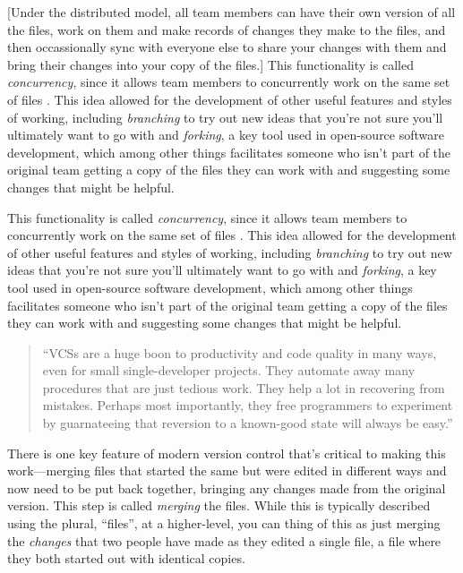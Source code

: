 \documentclass[]{tufte-book}
\begin{document}
{[}Under the distributed model, all team members can have their own version of all
the files, work on them and make records of changes they make to the files, and
then occassionally sync with everyone else to share your changes with them and
bring their changes into your copy of the files.{]} This functionality is called
\emph{concurrency}, since it allows team members to concurrently work on the same set
of files \citep{raymondunderstanding}. This idea allowed for the development of other
useful features and styles of working, including \emph{branching} to try out new
ideas that you're not sure you'll ultimately want to go with and \emph{forking}, a
key tool used in open-source software development, which among other things
facilitates someone who isn't part of the original team getting a copy of the
files they can work with and suggesting some changes that might be helpful.

This functionality is called \emph{concurrency}, since it allows team members to
concurrently work on the same set of files \citep{raymondunderstanding}. This idea
allowed for the development of other useful features and styles of working,
including \emph{branching} to try out new ideas that you're not sure you'll
ultimately want to go with and \emph{forking}, a key tool used in open-source
software development, which among other things facilitates someone who isn't
part of the original team getting a copy of the files they can work with and
suggesting some changes that might be helpful.

\begin{quote}
``VCSs are a huge boon to productivity and code quality in many ways, even for small
single-developer projects. They automate away many procedures that are just tedious
work. They help a lot in recovering from mistakes. Perhaps most importantly, they
free programmers to experiment by guarnateeing that reversion to a known-good
state will always be easy.'' \citep{raymond2003art}
\end{quote}

There is one key feature of modern version control that's
critical to making this work---merging files that started the same but were edited in
different ways and now need to be put back together, bringing any changes made from the
original version. This step is called \emph{merging} the files. While this is typically
described using the plural, ``files'', at a higher-level, you can thing of this as
just merging the \emph{changes} that two people have made as they edited a single file, a
file where they both started out with identical copies.
\end{document}
